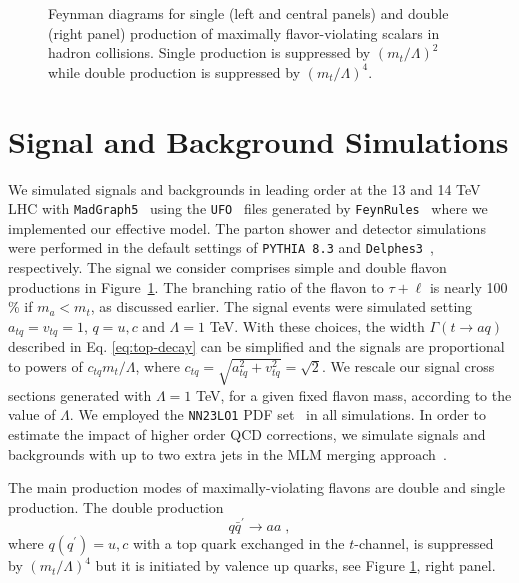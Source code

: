 \documentclass[prd,amsfonts,onecolumn,superscriptaddress,aps,nofootinbib,11pt]{revtex4-1}
\begin{document}
\begin{figure}[t]
    \centering
          
    \caption{Feynman diagrams for single (left and central panels) and double (right panel) production of maximally flavor-violating scalars in hadron collisions. Single production is suppressed by $(m_t/\Lambda)^2$ while double production is suppressed by $(m_t/\Lambda)^4$.}
    \label{fig:prod}
\end{figure}


\section{Signal and Background Simulations}\label{backs}


We simulated signals and backgrounds in leading order at the 13 and 14 TeV LHC with \texttt{MadGraph5}~\cite{Alwall:2014hca, Frederix:2018nkq} using the \texttt{UFO}~\cite{Degrande:2011ua} files generated by \texttt{FeynRules}~\cite{Alloul:2013bka} where we implemented our effective model.  The parton shower and detector simulations were performed in the default settings of \texttt{PYTHIA 8.3} \cite{Bierlich:2022pfr} and \texttt{Delphes3}~\cite{deFavereau:2013fsa}, respectively. The signal we consider comprises simple and double flavon productions in Figure~\ref{fig:prod}. The branching ratio of the flavon to $\tau+\ell$ is nearly 100 \% if $m_a<m_t$, as discussed earlier. The signal events were simulated setting $a_{tq}=v_{tq}=1$, $q=u,c$ and $\Lambda=1$ TeV. With these choices, the width $\Gamma(t \to aq)$ described in Eq. \eqref{eq:top-decay} can be simplified and the signals are proportional to powers of $c_{tq} m_t/\Lambda$, where $c_{tq} = \sqrt{a_{tq}^2 + v_{tq}^2} = \sqrt{2}$. We rescale our signal cross sections generated with $\Lambda=1$ TeV, for a given fixed flavon mass, according to the value of $\Lambda$. We employed the \texttt{NN23LO1} PDF set~\cite{Ball_2017} in all simulations. In order to estimate the impact of higher order QCD corrections, we simulate signals and backgrounds with up to two extra jets in the MLM merging approach~\cite{Mangano_2007}.

The main production modes of maximally-violating flavons are double and single production.
The double production
\begin{equation}
    q\bar{q}^\prime \to aa\; ,
\end{equation}
where $q(q^\prime)=u,c$ with a top quark exchanged in the $t$-channel, is suppressed by $(m_t/\Lambda)^4$ but it is initiated by valence up quarks, see Figure \ref{fig:prod}, right panel. 
\end{document}
